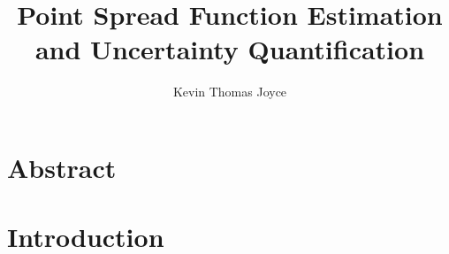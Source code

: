 \documentclass{book}
\title{Point Spread Function Estimation and Uncertainty Quantification}
\author{Kevin Thomas Joyce}
\begin{document}
\maketitle

\frontmatter
\tableofcontents
\listoffigures
\listoftables

\chapter{Abstract}

\mainmatter

\chapter{Introduction}

\end{document}
